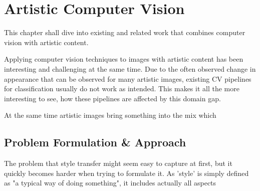 \setchapterpreamble[u]{\margintoc}
\chapter{Artistic Computer Vision}
This chapter shall dive into existing and related work that combines computer vision with artistic content.

Applying computer vision techniques to images with artistic content has been interesting and challenging at the same time.
Due to the often observed change in appearance that can be observed for many artistic images, existing CV pipelines for \ie classification usually do not work as intended.
This makes it all the more interesting to see, how these pipelines are affected by this domain gap.

At the same time artistic images bring something into the mix which 









\section{Problem Formulation \& Approach}
The problem that style transfer might seem easy to capture at first, but it quickly becomes harder when trying to formulate it.
As 'style' is simply defined as "a typical way of doing something", it includes actually all aspects 

